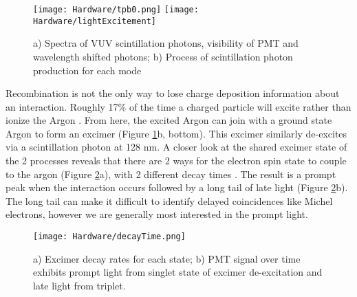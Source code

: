 \begin{figure}[h!]
\centering
\texttt{[image: Hardware/tpb0.png]}
\hspace{1 mm}
\texttt{[image: Hardware/lightExcitement]} %
\caption{ a) Spectra of VUV scintillation photons, visibility of PMT and wavelength shifted photons; b) Process of scintillation photon production for each mode  } 
\label{fig:decay}
\end{figure}


\par Recombination is not the only way to lose charge deposition information about an interaction. Roughly 17\% of the time a charged particle will excite rather than ionize the Argon \cite{bib:sorel}. From here, the excited Argon can join with a ground state Argon to form an excimer (Figure \ref{fig:decay}b, bottom). This excimer similarly de-excites via a scintillation photon at 128 nm.  A closer look at the shared excimer state of the 2 processes reveals that there are 2 ways for the electron spin state to couple to the argon (Figure \ref{fig:light}a), with 2 different decay times \cite{bib:lumin}. The result is a prompt peak when the interaction occurs followed by a long tail of late light (Figure \ref{fig:light}b).  The long tail can make it difficult to identify delayed coincidences like Michel electrons, however we are generally most interested in the prompt light. 
\begin{figure}[h!]
\centering
{}
\hspace{2 mm}
\texttt{[image: Hardware/decayTime.png]}
\caption{ a) Excimer decay rates for each state; b) PMT signal over time exhibits prompt light from singlet state of excimer de-excitation and late light from triplet. } 
\label{fig:light}
\end{figure}


